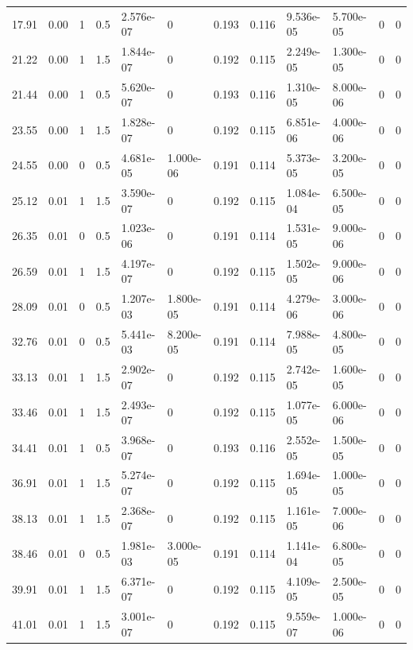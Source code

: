 \documentclass[preview]{standalone}
\begin{document}
{{\begin{tabular}{L{1.2cm}C{1.2cm} C{0.3cm}C{0.5cm} C{1.4cm}C{1.4cm} C{1.4cm}C{1.4cm} C{1.6cm}C{1.6cm} C{1.6cm}C{1.6cm}}
  17.91  &  0.00  & 1     & 0.5 &  2.576e-07  & 0  &  0.193&   0.116& 9.536e-05 & 5.700e-05   &  0 & 0  \\ 
  21.22  &  0.00  & 1     & 1.5 &  1.844e-07  & 0  &  0.192&   0.115& 2.249e-05 & 1.300e-05   &  0 & 0  \\ 
  21.44  &  0.00  & 1     & 0.5 &  5.620e-07  & 0  &  0.193&   0.116& 1.310e-05 & 8.000e-06   &  0 & 0  \\ 
  23.55  &  0.00  & 1     & 1.5 &  1.828e-07  & 0  &  0.192&   0.115& 6.851e-06 & 4.000e-06   &  0 & 0  \\ 
  24.55  &  0.00  & 0     & 0.5 &  4.681e-05  & 1.000e-06  &  0.191&   0.114& 5.373e-05 & 3.200e-05   &  0 & 0  \\ 
  25.12  &  0.01  & 1     & 1.5 &  3.590e-07  & 0  &  0.192&   0.115& 1.084e-04 & 6.500e-05   &  0 & 0  \\ 
  26.35  &  0.01  & 0     & 0.5 &  1.023e-06  & 0  &  0.191&   0.114& 1.531e-05 & 9.000e-06   &  0 & 0  \\ 
  26.59  &  0.01  & 1     & 1.5 &  4.197e-07  & 0  &  0.192&   0.115& 1.502e-05 & 9.000e-06   &  0 & 0  \\ 
  28.09  &  0.01  & 0     & 0.5 &  1.207e-03  & 1.800e-05  &  0.191&   0.114& 4.279e-06 & 3.000e-06   &  0 & 0  \\ 
  32.76  &  0.01  & 0     & 0.5 &  5.441e-03  & 8.200e-05  &  0.191&   0.114& 7.988e-05 & 4.800e-05   &  0 & 0  \\ 
  33.13  &  0.01  & 1     & 1.5 &  2.902e-07  & 0  &  0.192&   0.115& 2.742e-05 & 1.600e-05   &  0 & 0  \\ 
  33.46  &  0.01  & 1     & 1.5 &  2.493e-07  & 0  &  0.192&   0.115& 1.077e-05 & 6.000e-06   &  0 & 0  \\ 
  34.41  &  0.01  & 1     & 0.5 &  3.968e-07  & 0  &  0.193&   0.116& 2.552e-05 & 1.500e-05   &  0 & 0  \\ 
  36.91  &  0.01  & 1     & 1.5 &  5.274e-07  & 0  &  0.192&   0.115& 1.694e-05 & 1.000e-05   &  0 & 0  \\ 
  38.13  &  0.01  & 1     & 1.5 &  2.368e-07  & 0  &  0.192&   0.115& 1.161e-05 & 7.000e-06   &  0 & 0  \\ 
  38.46  &  0.01  & 0     & 0.5 &  1.981e-03  & 3.000e-05  &  0.191&   0.114& 1.141e-04 & 6.800e-05   &  0 & 0  \\ 
  39.91  &  0.01  & 1     & 1.5 &  6.371e-07  & 0  &  0.192&   0.115& 4.109e-05 & 2.500e-05   &  0 & 0  \\ 
  41.01  &  0.01  & 1     & 1.5 &  3.001e-07  & 0  &  0.192&   0.115& 9.559e-07 & 1.000e-06   &  0 & 0  \\ 

\end{tabular}}}
\end{document}
